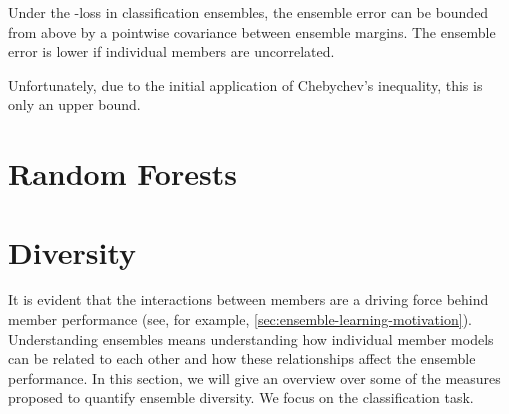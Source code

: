 \documentclass[
	twoside=false, %
]{kaobook}
\begin{document}
\begin{corollary}
Under the \zeroone-loss in classification ensembles, the ensemble error can be bounded from above by a pointwise covariance between ensemble margins. The ensemble error is lower if individual members are uncorrelated.
\end{corollary}
Unfortunately, due to the initial application of Chebychev's inequality, this is only an upper bound. 




\chapter{Random Forests}
\label{sec:random-forests}


\chapter{Diversity}
\label{sec:diversity}







It is evident that the interactions between members are a driving force behind member performance (see, for example, \cref{sec:ensemble-learning-motivation}). Understanding ensembles means understanding how individual member models can be related to each other and how these relationships affect the ensemble performance. In this section, we will give an overview over some of the measures proposed to quantify ensemble diversity. We focus on the classification task. 
\end{document}
